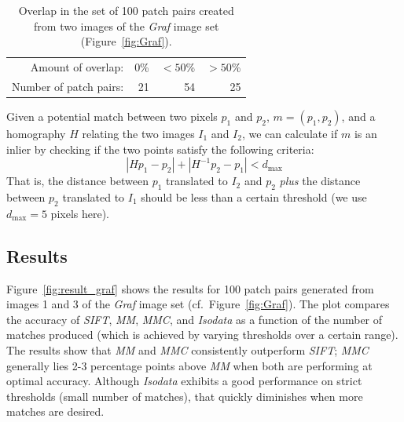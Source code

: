 \documentclass{article}
\begin{document}
\begin{table}[htb]
\caption{Overlap in the set of 100 patch pairs created from two images of the \emph{Graf} image set (Figure~\ref{fig:Graf}).}
\label{table:overlap}
	\centering
\begin{tabular}{r*{3}{r}}
\hline
	Amount of overlap: & 0\% & $< 50$\% & $> 50$\%  \\
	\noalign{\smallskip}
	Number of patch pairs: & 21 & 54 & 25 \\
	\hline
\end{tabular}
\end{table}


Given a potential match between two pixels $p_1$ and 
$p_2$, $m = \left(p_1, p_2\right)$, and a homography $H$ relating the two images $I_1$ and $I_2$, we 
can calculate if $m$ is an inlier by checking if the two points satisfy the following criteria:
\begin{equation*}
\left\vert H p_1 - p_2 \right\vert + \left\vert H^{-1}p_2 - p_1 \right\vert < d_{\max}
\end{equation*}
That is, the distance between $p_1$ translated to $I_2$ and $p_2$ 
\emph{plus} the distance between $p_2$ translated to $I_1$ should be 
less than a certain threshold (we use $d_{\max}=5$ pixels here).


\subsection{Results}
\label{S:Results}

Figure~\ref{fig:result_graf} shows the results for 100 patch pairs 
generated from images 1 and 3 of the \emph{Graf} image set (cf.~Figure~\ref{fig:Graf}). The plot 
compares the accuracy of \emph{SIFT}, \emph{MM}, \emph{MMC}, and 
\emph{Isodata} as a function of the number of matches produced (which is achieved by varying thresholds over a certain range). The results show that \emph{MM} and \emph{MMC} consistently outperform \emph{SIFT}; \emph{MMC} generally lies 2-3 percentage points above \emph{MM} when both are performing at optimal accuracy. 
Although \emph{Isodata} exhibits a good performance on strict thresholds (small number of matches), that quickly diminishes when more matches are desired.
\end{document}

